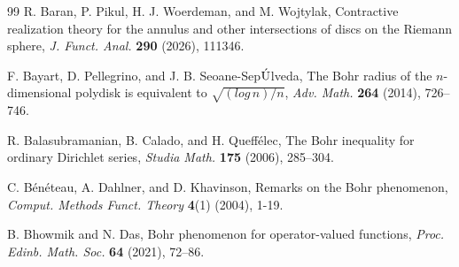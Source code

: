 \documentclass[a4paper,11pt, reqno]{amsart}
\theoremstyle{definition}
\begin{document}
\begin{thebibliography}{99}
	 {\sc R. Baran, P. Pikul, H. J. Woerdeman}, and {\sc M. Wojtylak}, Contractive realization theory for the annulus and other intersections of discs on the Riemann sphere, {\it J. Funct. Anal.} {\bf 290} (2026), 111346.
	
	 {\sc F. Bayart, D. Pellegrino}, and {\sc J. B. Seoane-Sep$\rm \acute{U}$lveda}, The Bohr radius of the $n$-dimensional polydisk is equivalent to $\sqrt{(log \, n)/n}$, {\it Adv. Math.} {\bf 264} (2014), 726--746.
	
	
		 {\sc R. Balasubramanian}, {\sc B. Calado}, and {\sc H. Queffélec}, The Bohr inequality for ordinary Dirichlet series, {\it Studia Math.} {\bf 175} (2006), 285--304.
	
	 {\sc C. B{\'e}n{\'e}teau}, {\sc A. Dahlner}, and {\sc D. Khavinson}, Remarks on the Bohr phenomenon, {\it Comput. Methods Funct. Theory} \textbf{4}(1) (2004), 1-19.
	
	
	
	
	
	 {\sc B. Bhowmik} and {\sc N. Das}, Bohr phenomenon for operator-valued functions, {\it Proc. Edinb. Math. Soc.} {\bf 64} (2021), 72--86.
	

\end{thebibliography}
\end{document}
